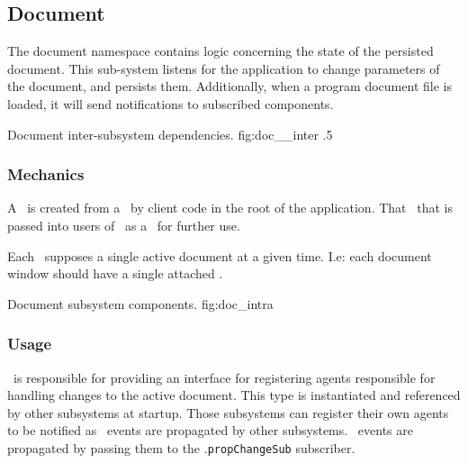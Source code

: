 \newcommand{\docarea}[3]{
      \index{#1}\pbodyitem{#2}{#3}
}

\newcommand{\extparamref}[3]{
      \index{#1}\pbodyitem{#2}{#3}
}

\subsection{Document}
The document namespace contains logic concerning the state of the persisted document.
This sub-system listens for the application to change parameters of the document, and persists them.
Additionally, when a program document file is loaded, it will send notifications to subscribed components.

{Document inter-subsystem dependencies.}
{fig:doc__inter}
{.5}


\subsubsection{Mechanics}
A \docsftype\ is created from a \docsfftype\ by client code in the root of the application.
That \docsftype\ that is passed into users of \docmod\ as a \docftype\ for further use.

Each \docftype\ supposes a single active document at a given time.
I.e: each document window should have a single attached \docftype.

{Document subsystem components.}
{fig:doc_intra}



\subsubsection{Usage}
\docftype\ is responsible for providing an interface for registering agents responsible for handling changes to the active document.
This type is instantiated and referenced by other subsystems at startup.
Those subsystems can register their own agents to be notified as \docpctype\ events are propagated by other subsystems.
\docpctype\ events are propagated by passing them to the \docftype .\texttt{propChangeSub} subscriber.